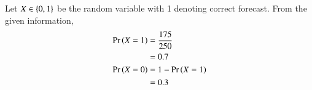 Let $X \in \left\{0,1\right\}$ be the random variable with 1 denoting correct forecast.
From the given information,
\begin{align}
\Pr\left(X=1\right) & = \frac{175}{250}
\\
&= 0.7
\\
\Pr\left(X=0\right) & = 1 - \Pr\left(X=1\right)
\\
&= 0.3
\end{align}
